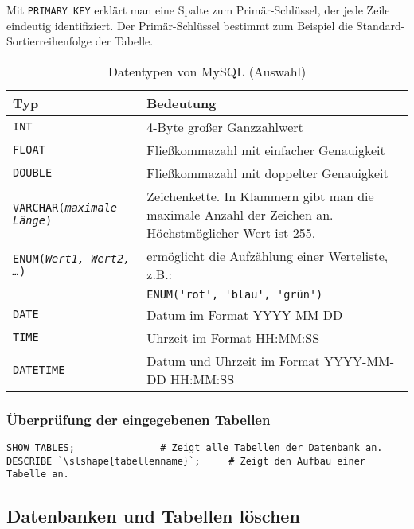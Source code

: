 Mit \lstinline{PRIMARY KEY} erklärt man eine Spalte zum Primär-Schlüssel, der
jede Zeile eindeutig identifiziert. Der Primär-Schlüssel bestimmt zum Beispiel
die Standard-Sortierreihenfolge der Tabelle.

\begin{table}[h]
\centering
\begin{tabular}{|l|p{11cm}|}
\hline
\bf{Typ} & \bf{Bedeutung}\\
\hline
{\lstinline!INT!} & 4-Byte großer Ganzzahlwert\\
\hline
{\lstinline!FLOAT!} & Fließkommazahl mit einfacher Genauigkeit\\
\hline
{\lstinline!DOUBLE!} & Fließkommazahl mit doppelter Genauigkeit\\
\hline
{\lstinline!VARCHAR(!}\tt{\slshape{maximale Länge}}{\lstinline!)!} &
Zeichenkette. In Klammern gibt man die maximale Anzahl der Zeichen an.
Höchstmöglicher Wert ist 255.\\
\hline
{\lstinline!ENUM(!}\tt{\slshape{Wert1, Wert2, \ldots}}{\lstinline!)!} & 
ermöglicht die Aufzählung einer Werteliste, z.B.:\\
& {\lstinline!ENUM('rot', 'blau', '!}\tt{grün}{\lstinline!')!}\\
\hline
{\lstinline!DATE!} & Datum im Format YYYY-MM-DD\\
\hline
{\lstinline!TIME!} & Uhrzeit im Format HH:MM:SS\\
\hline
{\lstinline!DATETIME!} & Datum und Uhrzeit im Format YYYY-MM-DD HH:MM:SS\\
\hline
\end{tabular}
\caption{Datentypen von MySQL (Auswahl)}
\label{tab:mysql-datentypen}
\end{table}

\subsubsection{Überprüfung der eingegebenen Tabellen}

\begin{lstlisting}
SHOW TABLES;               # Zeigt alle Tabellen der Datenbank an.
DESCRIBE `\slshape{tabellenname}`;     # Zeigt den Aufbau einer Tabelle an.
\end{lstlisting}

\subsection{Datenbanken und Tabellen löschen}

